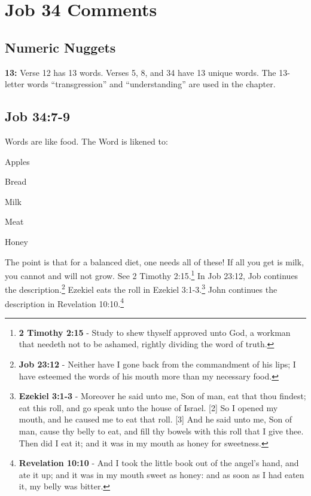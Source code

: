 \section{Job 34  Comments}

\subsection{Numeric Nuggets}
\textbf{13:} Verse 12 has 13 words.  Verses 5, 8, and 34 have 13 unique words. The 13-letter words ``transgression'' and ``understanding'' are used in the chapter.


\subsection{Job 34:7-9}
Words are like food. The  Word is likened to:\cite{thomas_20220309}
\begin{compactenum}
    \item Apples
    \item Bread
    \item Milk
    \item Meat
    \item Honey
\end{compactenum}
The point is that for a balanced diet, one needs all of these! If all you get is milk, you cannot and will not grow. See 2 Timothy 2:15.\footnote{\textbf{2 Timothy 2:15} -  Study to shew thyself approved unto God, a workman that needeth not to be ashamed, rightly dividing the word of truth.} In Job 23:12, Job continues the description.\footnote{\textbf{Job 23:12} - Neither have I gone back from the commandment of his lips; I have esteemed the words of his mouth more than my necessary food.} Ezekiel eats the roll in Ezekiel 3:1-3.\footnote{\textbf{Ezekiel 3:1-3} - Moreover he said unto me, Son of man, eat that thou findest; eat this roll, and go speak unto the house of Israel. [2] So I opened my mouth, and he caused me to eat that roll. [3] And he said unto me, Son of man, cause thy belly to eat, and fill thy bowels with this roll that I give thee. Then did I eat it; and it was in my mouth as honey for sweetness.} John continues the description in Revelation 10:10.\footnote{\textbf{Revelation 10:10} - And I took the little book out of the angel’s hand, and ate it up; and it was in my mouth sweet as honey: and as soon as I had eaten it, my belly was bitter.}\cite{thomas_20220309}

